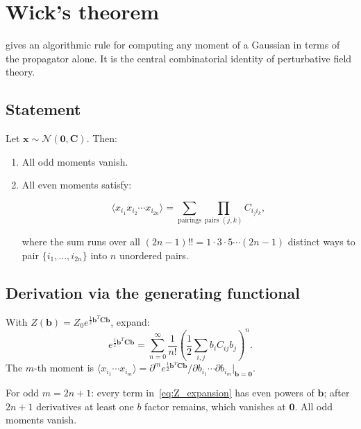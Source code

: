 \documentclass[justified,notoc]{tufte-handout}
\def\N{\mathcal{N}}
\renewcommand{\vec}[1]{\mathbf{#1}}
\begin{document}
\section{Wick's theorem}
\label{sec:wicks_theorem}

 gives an algorithmic rule for computing any moment of a Gaussian in terms of the propagator alone. It is the central combinatorial identity of perturbative field theory.

\subsection{Statement}

Let $\vec{x}\sim\N(\vec{0},\mathbf{C})$. Then:
\begin{enumerate}[leftmargin=*,label=(\arabic*)]
  \item All odd moments vanish.
  \item All even moments satisfy:
\begin{keyresult}
\begin{equation}
  \langle x_{i_1}x_{i_2}\cdots x_{i_{2n}}\rangle
  =\sum_{\text{pairings}}\prod_{\text{pairs }(j,k)} C_{i_j i_k},
  \label{eq:wicks_theorem}
\end{equation}
\end{keyresult}
where the sum runs over all $(2n-1)!!=1\cdot 3\cdot 5\cdots(2n-1)$ distinct ways to pair $\{i_1,\ldots,i_{2n}\}$ into $n$ unordered pairs.
\end{enumerate}

\subsection{Derivation via the generating functional}

With $Z(\vec{b})=Z_0 e^{\frac{1}{2}\vec{b}^T\mathbf{C}\vec{b}}$, expand:
\begin{equation}
  e^{\frac{1}{2}\vec{b}^T\mathbf{C}\vec{b}}=\sum_{n=0}^\infty\frac{1}{n!}\left(\frac{1}{2}\sum_{i,j}b_i C_{ij}b_j\right)^n.
  \label{eq:Z_expansion}
\end{equation}
The $m$-th moment is $\langle x_{i_1}\cdots x_{i_m}\rangle=\partial^m e^{\frac{1}{2}\vec{b}^T\mathbf{C}\vec{b}}/\partial b_{i_1}\cdots\partial b_{i_m}|_{\vec{b}=\vec{0}}$.

For odd $m=2n+1$: every term in~\eqref{eq:Z_expansion} has even powers of $\vec{b}$; after $2n+1$ derivatives at least one $b$ factor remains, which vanishes at $\vec{0}$. All odd moments vanish.
\end{document}
